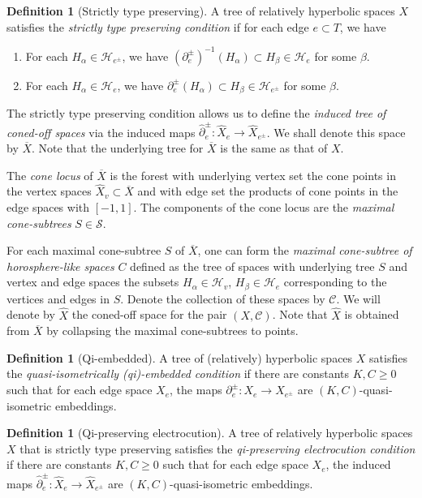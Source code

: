 \documentclass[11pt, a4paper]{amsart}
\theoremstyle{definition}
\newtheorem{definition}[theorem]{Definition}
\newcommand{\wh}[1]{\widehat{ #1 }}
\begin{document}
\begin{definition}[Strictly type preserving]
A tree of relatively hyperbolic spaces $X$ satisfies the \emph{strictly type preserving condition} if for each edge $e\subset T$, we have
\begin{enumerate}
\item For each $H_{\alpha}\in \mathcal{H}_{e^{\pm}}$, we have $(\partial_e^{\pm})^{-1}(H_{\alpha})\subset H_{\beta}\in\mathcal{H}_e$ for some $\beta$.
\item For each $H_{\alpha}\in \mathcal{H}_e$, we have $\partial^{\pm}_e(H_{\alpha})\subset H_{\beta}\in \mathcal{H}_{e^\pm}$ for some $\beta$.
\end{enumerate}
\end{definition}

The strictly type preserving condition allows us to define the \emph{induced tree of coned-off spaces} via the induced maps $\wh{\partial}_{e}^{\pm}\colon \wh{X}_e\to \wh{X}_{e^{\pm}}$. We shall denote this space by $\overline{X}$. Note that the underlying tree for $\overline{X}$ is the same as that of $X$. 

The \emph{cone locus} of $\overline{X}$ is the forest with underlying vertex set the cone points in the vertex spaces $\wh{X}_v\subset\overline{X}$ and with edge set the products of cone points in the edge spaces with $[-1, 1]$. The components of the cone locus are the \emph{maximal cone-subtrees} $S\in \mathcal{S}$.

For each maximal cone-subtree $S$ of $\overline{X}$, one can form the \emph{maximal cone-subtree of horosphere-like spaces} $C$ defined as the tree of spaces with underlying tree $S$ and vertex and edge spaces the subsets $H_{\alpha}\in \mathcal{H}_v$, $H_{\beta}\in \mathcal{H}_e$ corresponding to the vertices and edges in $S$. Denote the collection of these spaces by $\mathcal{C}$. We will denote by $\wh{X}$ the coned-off space for the pair $(X, \mathcal{C})$. Note that $\wh{X}$ is obtained from $\overline{X}$ by collapsing the maximal cone-subtrees to points.


\begin{definition}[Qi-embedded]
A tree of (relatively) hyperbolic spaces $X$ satisfies the \emph{quasi-isometrically (qi)-embedded condition} if there are constants $K, C\geqslant 0$ such that for each edge space $X_e$, the maps $\partial_e^{\pm}\colon X_e\to X_{e^{\pm}}$ are $(K, C)$-quasi-isometric embeddings.
\end{definition}

\begin{definition}[Qi-preserving electrocution]
A tree of relatively hyperbolic spaces $X$ that is strictly type preserving satisfies the \emph{qi-preserving electrocution condition} if there are constants $K, C\geqslant 0$ such that for each edge space $X_e$, the induced maps $\wh{\partial}_e^{\pm}\colon \wh{X}_e\to \wh{X}_{e^{\pm}}$ are $(K, C)$-quasi-isometric embeddings.
\end{definition}
\end{document}
